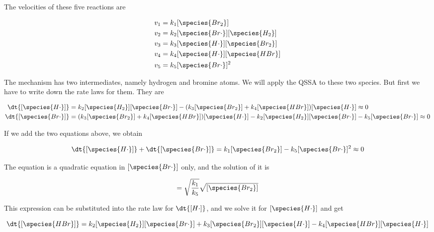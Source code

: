 The velocities of these five reactions are

\begin{subequations}
    \begin{align}
        v_1   &= k_1[\species{Br_2}]                     \\
        v_2   &= k_2[\species{Br\cdot}][\species{H_2}]   \\
        v_3   &= k_3[\species{H\cdot}][\species{Br_2}]   \\
        v_4   &= k_4[\species{H\cdot}][\species{HBr}]    \\
        v_5   &= k_5[\species{Br\cdot}]^2
    \end{align}
\end{subequations}

The mechanism has two intermediates, namely hydrogen and bromine atoms. We will apply the QSSA to these two species. But first we have to write down the rate laws for them. They are

\begin{subequations}
    \begin{align}
        \dt{[\species{H\cdot}]}   &= k_2[\species{H_2}][\species{Br\cdot}] - (k_3[\species{Br_2}] + k_4[\species{HBr}])[\species{H\cdot}] \approx 0 \\
        \dt{[\species{Br\cdot}]}  &= (k_3[\species{Br_2}] + k_4[\species{HBr}])[\species{H\cdot}] - k_2[\species{H_2}][\species{Br\cdot}] - k_5[\species{Br\cdot}] \approx 0
    \end{align}
\end{subequations}

If we add the two equations above, we obtain

\begin{equation}
    \dt{[\species{H\cdot}]} + \dt{[\species{Br\cdot}]} = k_1[\species{Br_2}] - k_5[\species{Br\cdot}]^2 \approx 0
\end{equation}

The equation is a quadratic equation in $[\species{Br\cdot}]$ only, and the solution of it is

\begin{equation}
    [\species{Br\cdot}] = \sqrt{\frac{k_1}{k_5}}\sqrt{[\species{Br_2}]}
\end{equation}

This expression can be substituted into the rate law for $\dt{[H\cdot]}$, and we solve it for $[\species{H\cdot}]$ and get

\begin{equation}
    \dt{[\species{HBr}]} = k_2 [\species{H_2}][\species{Br\cdot}] + k_3[\species{Br_2}][\species{H\cdot}] - k_4[\species{HBr}][\species{H\cdot}]
\end{equation}

